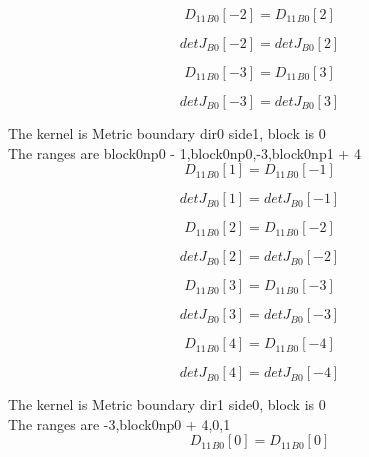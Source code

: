 \documentclass{article}
\begin{document}
\begin{dmath}{D_{11}{_{B0}}}[{-2}] = {D_{11}{_{B0}}}[{2}]\end{dmath}

\begin{dmath}{detJ{_{B0}}}[{-2}] = {detJ{_{B0}}}[{2}]\end{dmath}

\begin{dmath}{D_{11}{_{B0}}}[{-3}] = {D_{11}{_{B0}}}[{3}]\end{dmath}

\begin{dmath}{detJ{_{B0}}}[{-3}] = {detJ{_{B0}}}[{3}]\end{dmath}

\noindent The kernel is Metric boundary dir0 side1, block is 0\\\noindent The ranges are block0np0 - 1,block0np0,-3,block0np1 + 4\\\begin{dmath}{D_{11}{_{B0}}}[{1}] = {D_{11}{_{B0}}}[{-1}]\end{dmath}

\begin{dmath}{detJ{_{B0}}}[{1}] = {detJ{_{B0}}}[{-1}]\end{dmath}

\begin{dmath}{D_{11}{_{B0}}}[{2}] = {D_{11}{_{B0}}}[{-2}]\end{dmath}

\begin{dmath}{detJ{_{B0}}}[{2}] = {detJ{_{B0}}}[{-2}]\end{dmath}

\begin{dmath}{D_{11}{_{B0}}}[{3}] = {D_{11}{_{B0}}}[{-3}]\end{dmath}

\begin{dmath}{detJ{_{B0}}}[{3}] = {detJ{_{B0}}}[{-3}]\end{dmath}

\begin{dmath}{D_{11}{_{B0}}}[{4}] = {D_{11}{_{B0}}}[{-4}]\end{dmath}

\begin{dmath}{detJ{_{B0}}}[{4}] = {detJ{_{B0}}}[{-4}]\end{dmath}

\noindent The kernel is Metric boundary dir1 side0, block is 0\\\noindent The ranges are -3,block0np0 + 4,0,1\\\begin{dmath}{D_{11}{_{B0}}}[{0}] = {D_{11}{_{B0}}}[{0}]\end{dmath}
\end{document}
